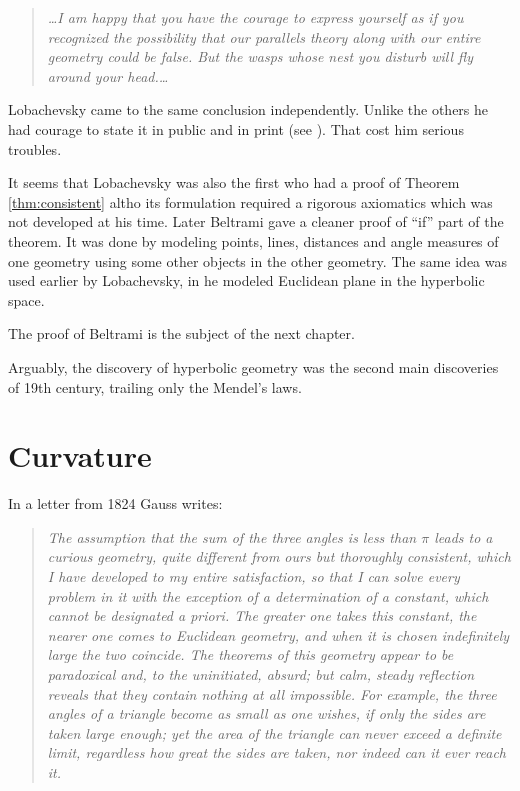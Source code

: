 \begin{quotation}{\it
\dots I am happy that you have the courage to express yourself as if you recognized the possibility
that our parallels theory along with our entire geometry could be false. But the wasps whose
nest you disturb will fly around your head.\dots}
\end{quotation}

Lobachevsky came to the same conclusion independently.
Unlike the others he had courage to state it in public and in print
(see \cite{lobachevsky}).
That cost him serious troubles.

It seems that Lobachevsky was also the first who had a proof of Theorem \ref{thm:consistent} altho its formulation required a rigorous axiomatics which was not developed at his time.
Later Beltrami gave a cleaner proof of ``if'' part of the theorem.
It was done by modeling points, lines, distances and angle measures of one geometry using some other objects in the other geometry.
The same idea was used earlier by Lobachevsky, 
in \cite[34]{lobachevsky-1840} he modeled Euclidean plane in the hyperbolic space.

The proof of Beltrami is the subject of the next chapter. 

\medskip

Arguably, the discovery of hyperbolic geometry was the second main discoveries of 19th century, 
trailing only the Mendel's laws.

\section*{Curvature}
In a letter from 1824 Gauss writes: 

\begin{quotation}{\it
The assumption that the sum of the three angles is less than $\pi$ leads to a curious geometry, 
quite different from ours but thoroughly consistent, 
which I have developed to my entire satisfaction, 
so that I can solve every problem in it with the exception of a determination of a constant, which cannot be designated a priori. 
The greater one takes this constant, the nearer one comes to Euclidean geometry, 
and when it is chosen indefinitely large the two coincide.
The theorems of this geometry appear to be paradoxical and, 
to the uninitiated, absurd; but calm, steady reflection reveals that they contain nothing at all impossible. 
For example, the three angles of a triangle become as small as one wishes, if only the sides are taken large enough; 
yet the area of the triangle can never exceed a definite limit, regardless how great the sides are taken, 
nor indeed can it ever reach it.}
\end{quotation} 

